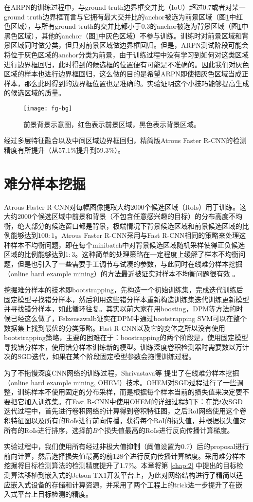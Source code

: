 在ARPN的训练过程中，与ground-truth边界框交并比（IoU）超过0.7或者对某一ground truth边界框而言与它拥有最大交并比的anchor被选为前景区域（图\ref{fig:fg-bg}中红色区域），与所有ground truth的交并比都小于0.3的anchor被选为背景区域（图\ref{fig:fg-bg}中黑色区域），其他的anchor（图\ref{fig:fg-bg}中灰色区域）不参与训练。训练时对前景区域和背景区域同时做分类，但只对前景区域做边界框回归。但是，ARPN测试阶段可能会将位于灰色区域的anchor分类为前景，由于训练过程中没有学习到如何对这类区域进行边界框回归，此时得到的候选框的位置便有可能是不准确的。因此我们对灰色区域的样本也进行边界框回归，这么做的目的是希望ARPN即使把灰色区域当成正样本，那么此时得到的边界框位置也是准确的。实验证明这个小技巧能够提高生成的候选区域的质量。
\begin{figure}[h]
	\centering
	\texttt{[image: fg-bg]}
	\caption{前景背景示意图，红色表示前景区域，黑色表示背景区域。}
	\label{fig:fg-bg}
\end{figure}
经过多层特征融合以及中间区域边界框回归，精简版Atrous Faster R-CNN的检测精度有所提升（从57.1\%提升到59.3\%）。
\section{难分样本挖掘}
Atrous Faster R-CNN对每幅图像提取大约2000个候选区域（RoIs）用于训练。这大约2000个候选区域中前景和背景（不包含任意感兴趣的目标）的分布高度不均衡，绝大部分的候选窗口都是背景，极端情况下背景候选区域和前景候选区域的比例能够达到$100:1$。Atrous Faster R-CNN采用与Fast R-CNN相同的策略来处理这种样本不均衡问题，即在每个minibatch中对背景候选区域随机采样使得正负候选区域的比例能够达到$1:3$。这种简单的处理策略在一定程度上缓解了样本不均衡问题，但是也引入了一些需要手工调节与试凑的参数，与此同时在线难分样本挖掘（online hard example mining）的方法最近被证实对样本不均衡问题很有效 \cite{ohem} \cite{densebox}。

挖掘难分样本的技术即bootstrapping，先构造一个初始训练集，完成迭代训练后固定模型寻找错分样本，然后利用这些错分样本重新构造训练集迭代训练更新模型并寻找错分样本，如此循环往复。其实以前大家在用boosting，DPM等方法的时候已经这么做了，Felzenszwalb证实在DPM中通过bootstrapping SVM可以在整个数据集上找到最优的分类策略。Fast R-CNN以及它的变体之所以没有使用bootstrapping策略，主要的困难在于：boostrapping的两个阶段是，使用固定模型寻找错分样本，使用错分样本训练新的模型。训练深度卷积检测器时需要数以万计次的SGD迭代，如果在某个阶段固定模型参数会拖慢训练过程。

为了不拖慢深度CNN网络的训练过程，Shrivastava等 \cite{ohem}提出了在线难分样本挖掘（online hard example mining, OHEM）技术。OHEM对SGD过程进行了一些调整，训练样本不使用固定的分布采样，而是根据每个样本当前的损失值来决定要不要把它加入训练集。在Fast R-CNN中使用OHEM的详细过程如下：在第$t$次SGD迭代过程中，首先进行卷积网络的计算得到卷积特征图，之后RoI网络使用这个卷积特征图以及所有的RoIs进行前向传播，获得每个RoI的损失值，并根据损失值对所有的RoIs进行排序，选择前$B$个损失值最高的RoIs进行反向传播计算梯度。

实验过程中，我们使用所有经过非极大值抑制（阈值设置为0.7）后的proposal进行前向计算，然后选择损失值最高的前128个进行反向传播计算梯度。采用难分样本挖掘将目标检测算法的检测精度提升了1.7\%。本章将第 \ref{chap:2} 中提出的目标检测算法移植到嵌入式的Jetson TX1开发平台上，为此对网络结构进行了精简以适应嵌入式设备的存储和计算资源，并采用了两个工程上的trick进一步提升了在嵌入式平台上目标检测的精度。